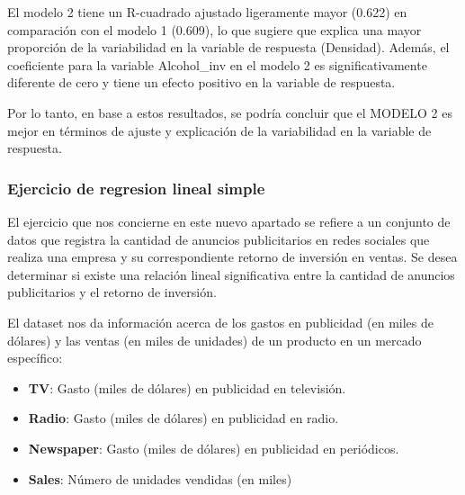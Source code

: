 \documentclass[11pt]{article}
\providecommand{\tightlist}{%
      \setlength{\itemsep}{0pt}\setlength{\parskip}{0pt}}
\begin{document}
El modelo 2 tiene un R-cuadrado ajustado ligeramente mayor (0.622) en
comparación con el modelo 1 (0.609), lo que sugiere que explica una
mayor proporción de la variabilidad en la variable de respuesta
(Densidad). Además, el coeficiente para la variable Alcohol\_inv en el
modelo 2 es significativamente diferente de cero y tiene un efecto
positivo en la variable de respuesta.

Por lo tanto, en base a estos resultados, se podría concluir que el
MODELO 2 es mejor en términos de ajuste y explicación de la variabilidad
en la variable de respuesta.

    \hypertarget{ejercicio-de-regresion-lineal-simple}{%
\subsubsection{Ejercicio de regresion lineal
simple}\label{ejercicio-de-regresion-lineal-simple}}

    El ejercicio que nos concierne en este nuevo apartado se refiere a un
conjunto de datos que registra la cantidad de anuncios publicitarios en
redes sociales que realiza una empresa y su correspondiente retorno de
inversión en ventas. Se desea determinar si existe una relación lineal
significativa entre la cantidad de anuncios publicitarios y el retorno
de inversión.

El dataset nos da información acerca de los gastos en publicidad (en
miles de dólares) y las ventas (en miles de unidades) de un producto en
un mercado específico:

\begin{itemize}
\tightlist
\item
  \textbf{TV}: Gasto (miles de dólares) en publicidad en televisión.\\
\item
  \textbf{Radio}: Gasto (miles de dólares) en publicidad en radio.\\
\item
  \textbf{Newspaper}: Gasto (miles de dólares) en publicidad en
  periódicos.\\
\item
  \textbf{Sales}: Número de unidades vendidas (en miles)
\end{itemize}
\end{document}
